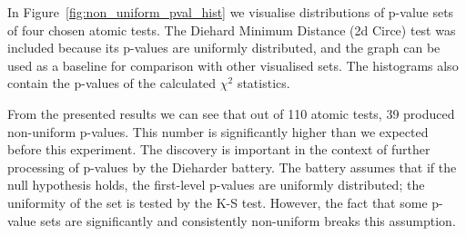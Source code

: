 \documentclass[
  digital,  	%
  color,		%
  oneside,   	%
  12pt,
  nocover,
  notable,
  nolof,
  nolot,
]{fithesis3}
\theoremstyle{definition}
\theoremstyle{remark}
\begin{document}
In Figure~\ref{fig:non_uniform_pval_hist} we visualise distributions of p-value sets of four chosen atomic tests. The Diehard Minimum Distance (2d Circe) test was included because its p-values are uniformly distributed, and the graph can be used as a baseline for comparison with other visualised sets. The histograms also contain the p-values of the calculated $\chi^2$ statistics.

From the presented results we can see that out of 110 atomic tests, 39 produced non-uniform p-values. This number is significantly higher than we expected before this experiment. The discovery is important in the context of further processing of p-values by the Dieharder battery. The battery assumes that if the null hypothesis holds, the first-level p-values are uniformly distributed; the uniformity of the set is tested by the K-S test. However, the fact that some p-value sets are significantly and consistently non-uniform breaks this assumption.
\end{document}
